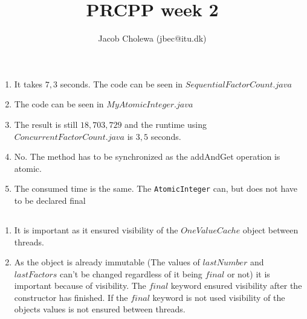 \documentclass{tufte-handout}
\title{PRCPP week 2}
\author{Jacob Cholewa (jbec@itu.dk)}
\begin{document}
\maketitle

\section{}


\subsection{}

\begin{enumerate}
\item It takes $7,3$ seconds. The code can be seen in $SequentialFactorCount.java$
\item The code can be seen in $MyAtomicInteger.java$
\item The result is still $18,703,729$ and the runtime using $ConcurrentFactorCount.java$ is $3,5$ seconds.
\item No. The method has to be synchronized as the addAndGet operation is atomic.
\item The consumed time is the same. The \texttt{AtomicInteger} can, but does not have to be declared final

\end{enumerate}

\subsection{}

\begin{enumerate}
\item It is important as it ensured visibility of the $OneValueCache$ object between threads.
\item As the object is already immutable (The values of $lastNumber$ and $lastFactors$ can't be changed regardless of it being $final$ or not) it is important because of visibility. The $final$ keyword ensured visibility after the constructor has finished. If the $final$ keyword is not used visibility of the objects values is not ensured between threads.
\end{enumerate}
\end{document}

